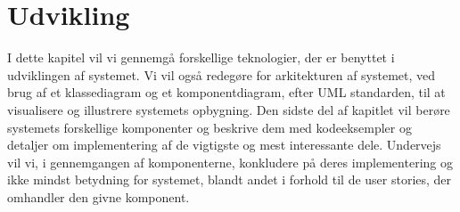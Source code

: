 \chapter{Udvikling}
I dette kapitel vil vi gennemgå forskellige teknologier, der er benyttet i udviklingen af systemet.
Vi vil også redegøre for arkitekturen af systemet, ved brug af et klassediagram og et komponentdiagram, efter UML standarden, til at visualisere og illustrere systemets opbygning.
Den sidste del af kapitlet vil berøre systemets forskellige komponenter og beskrive dem med kodeeksempler og detaljer om implementering af de vigtigste og mest interessante dele. 
Undervejs vil vi, i gennemgangen af komponenterne, konkludere på deres implementering og ikke mindst betydning for systemet, blandt andet i forhold til de user stories, der omhandler den givne komponent.










